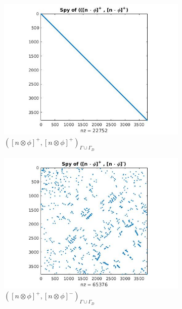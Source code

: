 \documentclass[a4paper,12pt]{book}
\begin{document}
\begin{figure}[H]
\begin{subfigure}{.5\textwidth}
\centering
  \includegraphics[width=\linewidth]{figure21.jpg}
  \caption{$([n \otimes \phi]^+,[n \otimes \phi]^+)_{\Gamma \cup \Gamma_D}$}
  \label{fig:figure21}
\end{subfigure}
\begin{subfigure}{.5\textwidth}	
\centering
  \includegraphics[width=\linewidth]{figure22.jpg}
  \caption{$([n \otimes \phi]^+,[n \otimes \phi]^-)_{\Gamma \cup \Gamma_D}$}
  \label{fig:figure22}
\end{subfigure}
\begin{subfigure}{.5\textwidth}
\centering

\end{subfigure}
\end{figure}
\end{document}
